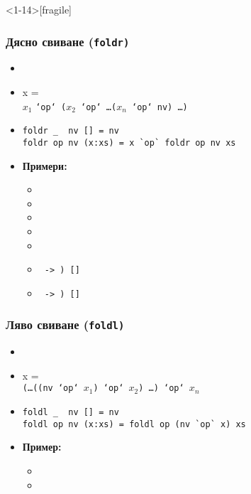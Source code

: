\documentclass[alsotrans]{beamerswitch}
\begin{document}
\begin{frame}<1-14>[fragile]
  \frametitle{Дясно свиване (\tt{foldr})}

  \begin{itemize}[<+->]
  \item {}
  \item {} \hlist x = \\
    $x_1$ \tt{`op` (}$x_2$ \tt{`op`} \ldots \tt($x_n$\tt{ `op` nv)} \ldots\tt)
  \item
\begin{lstlisting}
foldr _  nv [] = nv
foldr op nv (x:xs) = x `op` foldr op nv xs
\end{lstlisting}
  \item \textbf{Примери:}
    \begin{itemize}
    \item {}
    \item {}
    \item {}
    \item {}
    \item {}
    \item {} \tt{ -> ) []}
      \onslide<+->
    \item \footnotesize{}\tt{ -> ) []}
    \end{itemize}
  \end{itemize}
\end{frame}

\begin{frame}[fragile]
  \frametitle{Ляво свиване (\tt{foldl})}

  \begin{itemize}[<+->]
  \item {}
  \item {}\hlist x = \\
    \tt(\ldots\tt{((nv `op` }$x_1$\tt{) `op` }$x_2$\tt) \ldots \tt{) `op` }$x_n$
  \item
\begin{lstlisting}
foldl _  nv [] = nv
foldl op nv (x:xs) = foldl op (nv `op` x) xs
\end{lstlisting}
  \item \textbf{Пример:}
    \begin{itemize}[<.->]
    \item {}
    \item {}
    \end{itemize}
  \end{itemize}
\end{frame}
\end{document}

